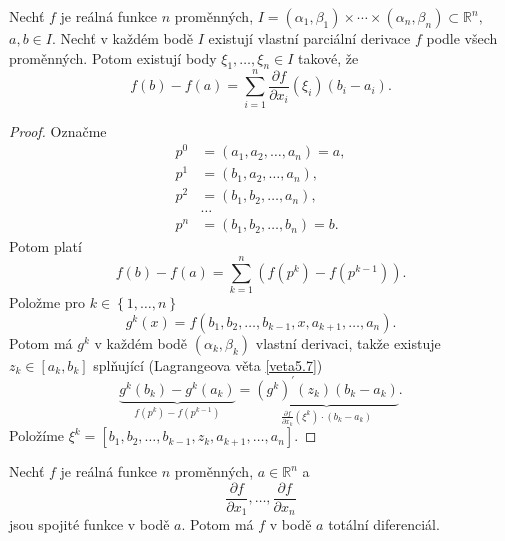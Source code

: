 \begin{lemma}\label{lemma10.3}
Nechť $f$ je reálná funkce $n$ proměnných,
$
I=
(\alpha_1,\beta_1)
\times\cdots\times
(\alpha_n,\beta_n)
\subset\mathbb{R}^n,
$
$a,b\in I$.
Nechť v každém bodě $I$ existují vlastní
parciální derivace $f$
podle všech proměnných.
Potom existují body
$
\xi_1,\dots,\xi_n\in I
$
takové, že
\[
f(b)-f(a)
=
\sum_{i=1}^{n}
\frac{\partial f}{\partial x_i}
(\xi_i)
(b_i-a_i).
\]
\end{lemma}

\begin{proof}
	Označme
	\begin{align*}
	p^0 &= (a_1,a_2,\dots,a_n) = a,\\
	p^1 &= (b_1,a_2,\dots, a_n),\\
	p^2 &= (b_1,b_2, \dots, a_n),\\
	&\dots \\
	p^n &= (b_1,b_2,\dots,b_n) = b.
\end{align*}
Potom platí
$$
    f(b) - f(a) = \sum_{k=1}^n \left( f(p^k)-f(p^{k-1}) \right ).
$$
Položme pro $k\in \left \{ 1,\dots,n \right \} $
$$
    g^k(x)=f(b_1, b_2,\dots, b_{k-1}, x, a_{k+1}, \dots, a_n).
$$
Potom má $g^k$ v každém bodě $(\alpha_k, \beta_k)$ vlastní derivaci, takže existuje $z_k \in [a_k, b_k]$
splňující (Lagrangeova věta \ref{veta5.7})
$$
    \underbrace{g^k(b_k)-g^k(a_k)}_{f(p^k)-f(p^{k-1})}=\underbrace{(g^k)^\prime(z_k)(b_k-a_k)}_{\frac{\partial f }{\partial x_k}(\xi^k)\cdot (b_k-a_k)}.
$$
Položíme $\xi^k = [b_1,b_2,\dots,b_{k-1},z_k, a_{k+1}, \dots,a_n]$.
\end{proof}

\begin{veta}\label{veta10.4}
Nechť $f$ je reálná funkce
$n$ proměnných,
$a\in\mathbb{R}^n$
a
\[
\frac{\partial f}{\partial x_1},
\dots,
\frac{\partial f}{\partial x_n}
\]
jsou spojité funkce v bodě $a$.
Potom má $f$ v bodě $a$
totální diferenciál.
\end{veta}

